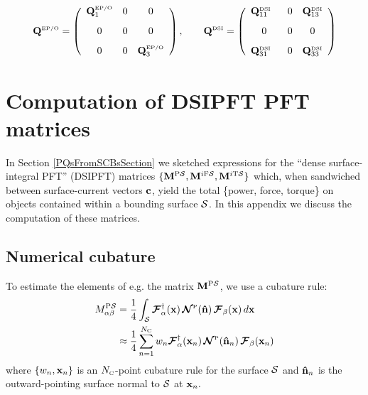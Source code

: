 \documentclass[letterpaper]{article}
\newcommand{\PS}{^{\text{\scriptsize P}\mc S}}
\newcommand{\IFS}{^{i\text{\scriptsize F}\mc S}}
\newcommand{\ITS}{^{i\text{\scriptsize T}\mc S}}
\begin{document}
$$ \vb Q\supt{EP/O}
    =
   \left(\begin{array}{ccc}
   \vb Q\supt{EP/O}_{1}
   & 0
   & 0
\\[8pt]
     0
   & 0
   & 0
\\[8pt]
     0 
   & 0
   & \vb Q\supt{EP/O}_{3}
   \end{array}\right), 
\qquad
   \vb Q\supt{DSI}
    =
   \left(\begin{array}{ccc}
   \vb Q\supt{DSI}_{11} 
   \vphantom{\vb Q\supt{EP/O}_1}
   \,\,\,\,
   & 0
   & \vb Q\supt{DSI}_{13}
\\[8pt]
     0
   & 0
   & 0
\\[8pt]
   \vb Q\supt{DSI}_{31} \vphantom{\vb Q\supt{EP/O}_1}
   \,\,\,\,
   & 0
   & \vb Q\supt{DSI}_{33}
   \end{array}\right)
$$

\newpage
\appendix
\section{Computation of DSIPFT PFT matrices}

In Section \ref{PQsFromSCBsSection} we sketched expressions for
the ``dense surface-integral PFT'' (DSIPFT)
matrices $\{\vb M\PS, \vb M\IFS, \vb M\ITS\}$ which, when sandwiched
between surface-current vectors $\mathbf{c}$, yield the total
\{power, force, torque\} on objects contained within a bounding
surface $\mathcal{S}$. In this appendix we discuss the computation of 
these matrices.

\subsection{Numerical cubature}

To estimate the elements of e.g. the matrix $\vb M\PS$, we
use a cubature rule:
\begin{align}
  M_{\alpha\beta}\PS
 &= \frac{1}{4} \int_{\mc S} 
    \bmc F^\dagger_\alpha(\vb x) 
    \,
    \bmc N\supt{P}(\vbhat{n})
    \,
    \bmc F_\beta(\vb x) 
     \, d\vb x
\nn
 &\approx \frac{1}{4} \sum_{n=1}^{N\subt{C}} w_n 
    \bmc F^\dagger_\alpha(\vb x_n) 
    \,
    \bmc N\supt{P}(\vbhat{n}_n)
    \,
    \bmc F_\beta(\vb x_n) 
\label{MPSCubature}
\end{align}
where $\{w_n, \mathbf{x}_n\}$ is an $N_{\hbox{\tiny{C}}}$-point cubature rule 
for the surface $\mathcal{S}$ and $\mathbf{\hat n}_n$ is the outward-pointing
surface normal to $\mathcal{S}$ at $\mathbf{x}_n.$
 
\end{document}
